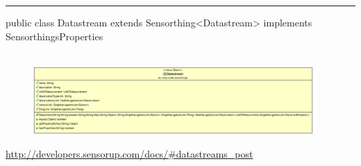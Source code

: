 \rule{\textwidth}{0.4pt}
public class Datastream extends Sensorthing<Datastream> implements SensorthingsProperties
\\\\
\begin{minipage}{0.4\textwidth}
    \begin{figure}[H]
        {\centering\includegraphics[width=0.95\textwidth]{media/backend/modell/classes/Datastream.png}}
    \end{figure}
    \end{minipage} \hfill
\begin{minipage}{0.6\textwidth}
    \url{http://developers.sensorup.com/docs/#datastreams_post}
\end{minipage}

